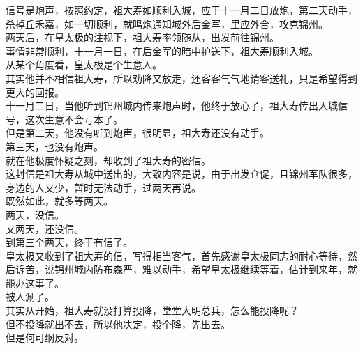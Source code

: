 \begin{multicols}{\theparacolNo}
信号是炮声，按照约定，祖大寿如顺利入城，应于十一月二日放炮，第二天动手，杀掉丘禾嘉，如一切顺利，就鸣炮通知城外后金军，里应外合，攻克锦州。\\

两天后，在皇太极的注视下，祖大寿率领随从，出发前往锦州。\\

事情非常顺利，十一月一日，在后金军的暗中护送下，祖大寿顺利入城。\\

从某个角度看，皇太极是个生意人。\\

其实他并不相信祖大寿，所以劝降又放走，还客客气气地请客送礼，只是希望得到更大的回报。\\

十一月二日，当他听到锦州城内传来炮声时，他终于放心了，祖大寿传出入城信号，这次生意不会亏本了。\\

但是第二天，他没有听到炮声，很明显，祖大寿还没有动手。\\

第三天，也没有炮声。\\

就在他极度怀疑之刻，却收到了祖大寿的密信。\\

这封信是祖大寿从城中送出的，大致内容是说，由于出发仓促，且锦州军队很多，身边的人又少，暂时无法动手，过两天再说。\\

既然如此，就多等两天。\\

两天，没信。\\

又两天，还没信。\\

到第三个两天，终于有信了。\\

皇太极又收到了祖大寿的信，写得相当客气，首先感谢皇太极同志的耐心等待，然后诉苦，说锦州城内防布森严，难以动手，希望皇太极继续等着，估计到来年，就能办这事了。\\

被人涮了。\\

其实从开始，祖大寿就没打算投降，堂堂大明总兵，怎么能投降呢？\\

但不投降就出不去，所以他决定，投个降，先出去。\\

但是何可纲反对。\\


\end{multicols}
